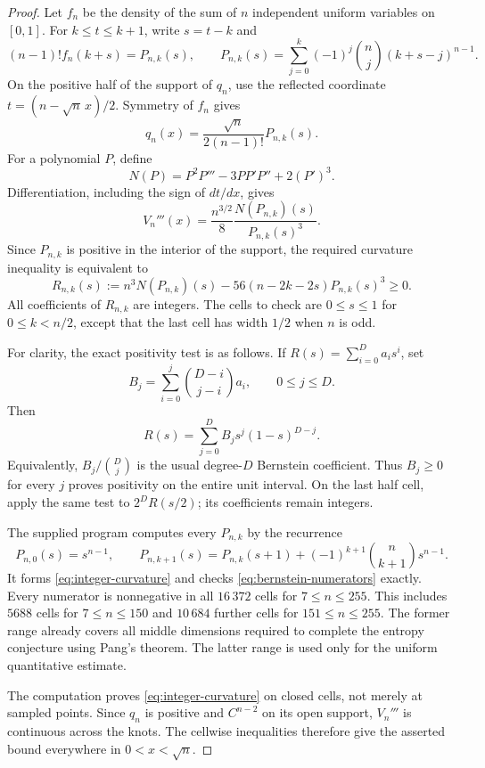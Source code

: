 \documentclass[11pt,a4paper]{article}
\theoremstyle{remark}\newtheorem{remark}[theorem]{Remark}
\begin{document}
\begin{proof}
Let $f_n$ be the density of the sum of $n$ independent uniform variables
on $[0,1]$. For $k\le t\le k+1$, write $s=t-k$ and
\[
 (n-1)!f_n(k+s)=P_{n,k}(s),\qquad
 P_{n,k}(s)=\sum_{j=0}^k(-1)^j\binom nj(k+s-j)^{n-1}.
\]
On the positive half of the support of $q_n$, use the reflected
coordinate $t=(n-\sqrt n\,x)/2$. Symmetry of $f_n$ gives
\[
 q_n(x)=\frac{\sqrt n}{2(n-1)!}P_{n,k}(s).
\]
For a polynomial $P$, define
\[
 N(P)=P^2P'''-3PP'P''+2(P')^3.
\]
Differentiation, including the sign of $dt/dx$, gives
\[
 V_n'''(x)=\frac{n^{3/2}}8\frac{N(P_{n,k})(s)}{P_{n,k}(s)^3}.
\]
Since $P_{n,k}$ is positive in the interior of the support, the required
curvature inequality is equivalent to
\begin{equation}\label{eq:integer-curvature}
 R_{n,k}(s):=n^3N(P_{n,k})(s)
       -56(n-2k-2s)P_{n,k}(s)^3\ge0.
\end{equation}
All coefficients of $R_{n,k}$ are integers. The cells to check are
$0\le s\le1$ for $0\le k<n/2$, except that the last cell has width
$1/2$ when $n$ is odd.

For clarity, the exact positivity test is as follows. If
$R(s)=\sum_{i=0}^Da_is^i$, set
\begin{equation}\label{eq:bernstein-numerators}
 B_j=\sum_{i=0}^j\binom{D-i}{j-i}a_i,
 \qquad 0\le j\le D.
\end{equation}
Then
\[
 R(s)=\sum_{j=0}^D B_j s^j(1-s)^{D-j}.
\]
Equivalently, $B_j/\binom Dj$ is the usual degree-$D$ Bernstein
coefficient. Thus $B_j\ge0$ for every $j$ proves positivity on the
entire unit interval. On the last half cell, apply the same test to
$2^D R(s/2)$; its coefficients remain integers.

The supplied program computes every $P_{n,k}$ by the recurrence
\[
 P_{n,0}(s)=s^{n-1},\qquad
 P_{n,k+1}(s)=P_{n,k}(s+1)
       +(-1)^{k+1}\binom n{k+1}s^{n-1}.
\]
It forms \eqref{eq:integer-curvature} and checks
\eqref{eq:bernstein-numerators} exactly. Every numerator is nonnegative
in all $16\,372$ cells for $7\le n\le255$. This includes $5688$ cells
for $7\le n\le150$ and $10\,684$ further cells for $151\le n\le255$.
The former range already covers all middle dimensions required to
complete the entropy conjecture using Pang's theorem. The latter range
is used only for the uniform quantitative estimate.

The computation proves \eqref{eq:integer-curvature} on closed cells,
not merely at sampled points. Since $q_n$ is positive and $C^{n-2}$
on its open support, $V_n'''$ is continuous across the knots. The
cellwise inequalities therefore give the asserted bound everywhere
in $0<x<\sqrt n$.
\end{proof}
\end{document}
